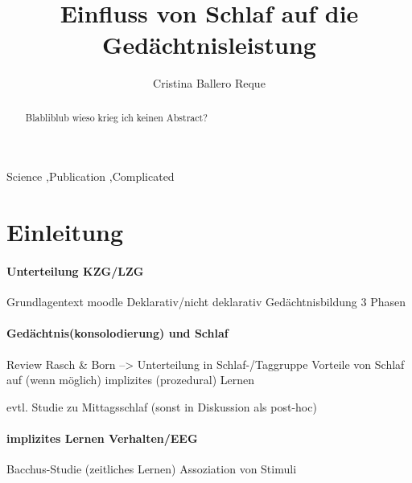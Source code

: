 \documentclass[preprint,12pt]{elsarticle}
\begin{document}
\begin{frontmatter}



\title{Einfluss von Schlaf auf die Gedächtnisleistung}







\author{Cristina Ballero Reque}
\address{Ruhr-Universität Bochum}

\end{frontmatter}
\newpage

\tableofcontents
{}
\clearpage
{}

\begin{abstract}
    Blabliblub wieso krieg ich keinen Abstract?
\end{abstract}
\begin{keyword}
Science \sep Publication \sep Complicated
\end{keyword}

\section{Einleitung}
\label{S:1}


\paragraph{Unterteilung KZG/LZG}
Grundlagentext moodle
Deklarativ/nicht deklarativ
Gedächtnisbildung 3 Phasen

\paragraph{Gedächtnis(konsolodierung) und Schlaf}
Review Rasch \& Born
--> Unterteilung in Schlaf-/Taggruppe
Vorteile von Schlaf auf (wenn möglich) implizites (prozedural) Lernen

evtl. Studie zu Mittagsschlaf (sonst in Diskussion als post-hoc)

\paragraph{implizites Lernen Verhalten/EEG}
Bacchus-Studie (zeitliches Lernen)
Assoziation von Stimuli
\end{document}
